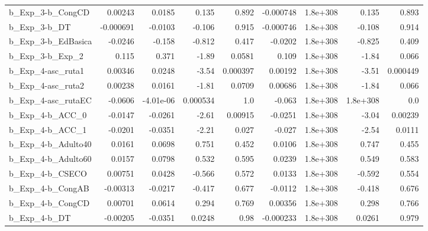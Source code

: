 \begin{tabular}{lrrrrrrrr}
b\_Exp\_3-b\_CongCD             &     0.00243 &       0.0185 &     0.135 &    0.892 &  -0.000748 &    1.8e+308 &        0.135 &         0.893 \\
b\_Exp\_3-b\_DT                 &   -0.000691 &      -0.0103 &    -0.106 &    0.915 &  -0.000746 &    1.8e+308 &       -0.108 &         0.914 \\
b\_Exp\_3-b\_EdBasica           &     -0.0246 &       -0.158 &    -0.812 &    0.417 &    -0.0202 &    1.8e+308 &       -0.825 &         0.409 \\
b\_Exp\_3-b\_Exp\_2              &       0.115 &        0.371 &     -1.89 &   0.0581 &      0.109 &    1.8e+308 &        -1.84 &         0.066 \\
b\_Exp\_4-asc\_ruta1            &     0.00346 &       0.0248 &     -3.54 & 0.000397 &    0.00192 &    1.8e+308 &        -3.51 &      0.000449 \\
b\_Exp\_4-asc\_ruta2            &     0.00238 &       0.0161 &     -1.81 &   0.0709 &    0.00686 &    1.8e+308 &        -1.84 &         0.066 \\
b\_Exp\_4-asc\_rutaEC           &     -0.0606 &    -4.01e-06 &  0.000534 &      1.0 &     -0.063 &    1.8e+308 &     1.8e+308 &           0.0 \\
b\_Exp\_4-b\_ACC\_0              &     -0.0147 &      -0.0261 &     -2.61 &  0.00915 &    -0.0251 &    1.8e+308 &        -3.04 &       0.00239 \\
b\_Exp\_4-b\_ACC\_1              &     -0.0201 &      -0.0351 &     -2.21 &    0.027 &     -0.027 &    1.8e+308 &        -2.54 &        0.0111 \\
b\_Exp\_4-b\_Adulto40           &      0.0161 &       0.0698 &     0.751 &    0.452 &     0.0106 &    1.8e+308 &        0.747 &         0.455 \\
b\_Exp\_4-b\_Adulto60           &      0.0157 &       0.0798 &     0.532 &    0.595 &     0.0239 &    1.8e+308 &        0.549 &         0.583 \\
b\_Exp\_4-b\_CSECO              &     0.00751 &       0.0428 &    -0.566 &    0.572 &     0.0133 &    1.8e+308 &       -0.592 &         0.554 \\
b\_Exp\_4-b\_CongAB             &    -0.00313 &      -0.0217 &    -0.417 &    0.677 &    -0.0112 &    1.8e+308 &       -0.418 &         0.676 \\
b\_Exp\_4-b\_CongCD             &     0.00701 &       0.0614 &     0.294 &    0.769 &    0.00356 &    1.8e+308 &        0.298 &         0.766 \\
b\_Exp\_4-b\_DT                 &    -0.00205 &      -0.0351 &    0.0248 &     0.98 &  -0.000233 &    1.8e+308 &       0.0261 &         0.979 \\

\end{tabular}
